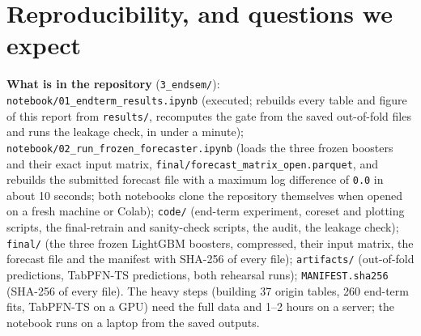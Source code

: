 \documentclass[10pt,a4paper,twocolumn]{article}
\newcommand{\n}[1]{\texttt{#1}}
\newcommand{\code}[1]{\texttt{#1}}
\begin{document}
\section{Reproducibility, and questions we expect}

\textbf{What is in the repository} (\code{3\_endsem/}): \code{notebook/01\_endterm\_results.ipynb} (executed; rebuilds every
table and figure of this report from \code{results/}, recomputes the gate from the saved out-of-fold files and runs the
leakage check, in under a minute); \code{notebook/02\_run\_frozen\_forecaster.ipynb} (loads the three frozen boosters and their
exact input matrix, \code{final/forecast\_matrix\_open.parquet}, and rebuilds the submitted forecast file with a maximum
log difference of \n{0.0} in about 10 seconds; both notebooks clone the repository themselves when opened on a fresh machine
or Colab); \code{code/} (end-term experiment, coreset and plotting scripts, the final-retrain and sanity-check scripts, the
audit, the leakage check); \code{final/} (the three frozen LightGBM boosters, compressed, their input matrix, the forecast file
and the manifest with SHA-256 of every file);
\code{artifacts/} (out-of-fold predictions, TabPFN-TS predictions, both rehearsal runs); \code{MANIFEST.sha256} (SHA-256 of
every file). The heavy steps (building 37 origin tables, 260 end-term fits, TabPFN-TS on a GPU) need the full data and
1--2 hours on a server; the notebook runs on a laptop from the saved outputs.
\end{document}
